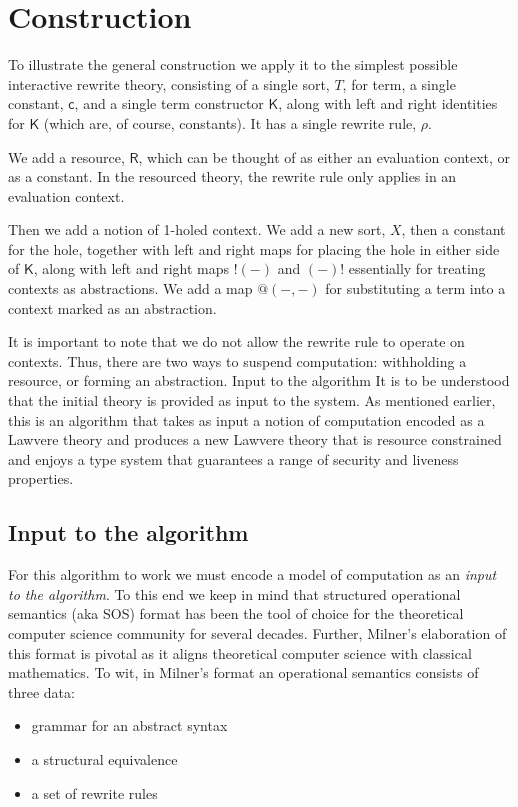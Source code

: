 \documentclass{llncs}
\renewcommand{\:}{\colon}
\begin{document}
\section{Construction}
To illustrate the general construction we apply it to the simplest
possible interactive rewrite theory, consisting of a single sort, $T$,
for term, a single constant, $\mathsf{c}$, and a single term constructor $\mathsf{K}$, along
with left and right identities for $\mathsf{K}$ (which are, of course,
constants). It has a single rewrite rule, $\rho$.

We add a resource, $\mathsf{R}$, which can be thought of as either an evaluation
context, or as a constant. In the resourced theory, the rewrite rule
only applies in an evaluation context.

Then we add a notion of 1-holed context. We add a new sort, $X$, then a
constant for the hole, together with left and right maps for placing
the hole in either side of $\mathsf{K}$, along with left and right maps $!(-)$ and
$(-)!$ essentially for treating contexts as abstractions. We add a map
$@(-,-)$ for substituting a term into a context marked as an
abstraction.

It is important to note that we do not allow the rewrite rule to
operate on contexts. Thus, there are two ways to suspend computation:
withholding a resource, or forming an abstraction.  Input to the
algorithm It is to be understood that the initial theory is provided
as input to the system. As mentioned earlier, this is an algorithm
that takes as input a notion of computation encoded as a Lawvere
theory and produces a new Lawvere theory that is resource constrained
and enjoys a type system that guarantees a range of security and
liveness properties.

\subsection{Input to the algorithm}
For this algorithm to work we must encode a model of computation as an
\emph{input to the algorithm}. To this end we keep in mind that
structured operational semantics (aka SOS) format has been the tool of
choice for the theoretical computer science community for several
decades. Further, Milner's elaboration of this format is pivotal as it
aligns theoretical computer science with classical mathematics. To
wit, in Milner's format an operational semantics consists of three
data:

\begin{itemize}
  \item grammar for an abstract syntax
  \item a structural equivalence
  \item a set of rewrite rules
\end{itemize}
\end{document}
